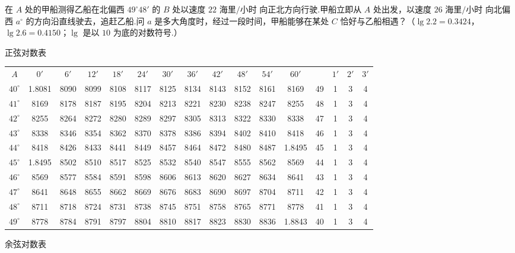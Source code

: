 \documentclass[UTF8,a4paper,oneside,11pt]{ctexbook}
\begin{document}
\begin{problem}
在 \(A\) 处的甲船测得乙船在北偏西 \(49^\circ48'\) 的 \(B\) 处以速度 \(22\text{ 海里/小时}\) 向正北方向行驶.甲船立即从 \(A\) 处出发，以速度 \(26\text{ 海里/小时}\) 向北偏西 \(a^\circ\) 的方向沿直线驶去，追赶乙船.问 \(a\) 是多大角度时，经过一段时间，甲船能够在某处 \(C\) 恰好与乙船相遇？（\(\lg 2.2=0.3424\)，\(\lg 2.6=0.4150\)；\(\lg\) 是以 \(10\) 为底的对数符号.）

\begin{center}
\begin{minipage}{\linewidth}
\centering
\scriptsize
\setlength{\tabcolsep}{2.2pt}
正弦对数表

\begin{tabular}{c|ccccccccccc|c|ccc}
\hline
\(A\) & \( 0' \) & \( 6' \) & \( 12' \) & \( 18' \) & \( 24' \) & \( 30' \) & \( 36' \) & \( 42' \) & \( 48' \) & \( 54' \) & \( 60' \) &  & \( 1' \) & \( 2' \) & \( 3' \) \\
\( 40^\circ \) & 1.8081 & 8090 & 8099 & 8108 & 8117 & 8125 & 8134 & 8143 & 8152 & 8161 & 8169 & 49 & 1 & 3 & 4 \\
\( 41^\circ \) & 8169 & 8178 & 8187 & 8195 & 8204 & 8213 & 8221 & 8230 & 8238 & 8247 & 8255 & 48 & 1 & 3 & 4 \\
\( 42^\circ \) & 8255 & 8264 & 8272 & 8280 & 8289 & 8297 & 8305 & 8313 & 8322 & 8330 & 8338 & 47 & 1 & 3 & 4 \\
\( 43^\circ \) & 8338 & 8346 & 8354 & 8362 & 8370 & 8378 & 8386 & 8394 & 8402 & 8410 & 8418 & 46 & 1 & 3 & 4 \\
\( 44^\circ \) & 8418 & 8426 & 8433 & 8441 & 8449 & 8457 & 8464 & 8472 & 8480 & 8487 & 1.8495 & 45 & 1 & 3 & 4 \\
\( 45^\circ \) & 1.8495 & 8502 & 8510 & 8517 & 8525 & 8532 & 8540 & 8547 & 8555 & 8562 & 8569 & 44 & 1 & 3 & 4 \\
\( 46^\circ \) & 8569 & 8577 & 8584 & 8591 & 8598 & 8606 & 8613 & 8620 & 8627 & 8634 & 8641 & 43 & 1 & 3 & 4 \\
\( 47^\circ \) & 8641 & 8648 & 8655 & 8662 & 8669 & 8676 & 8683 & 8690 & 8697 & 8704 & 8711 & 42 & 1 & 3 & 4 \\
\( 48^\circ \) & 8711 & 8718 & 8724 & 8731 & 8738 & 8745 & 8751 & 8758 & 8765 & 8771 & 8778 & 41 & 1 & 3 & 4 \\
\( 49^\circ \) & 8778 & 8784 & 8791 & 8797 & 8804 & 8810 & 8817 & 8823 & 8830 & 8836 & 1.8843 & 40 & 1 & 3 & 4 \\
\hline
\end{tabular}

余弦对数表
\end{minipage}
\end{center}

\end{problem}
\end{document}
